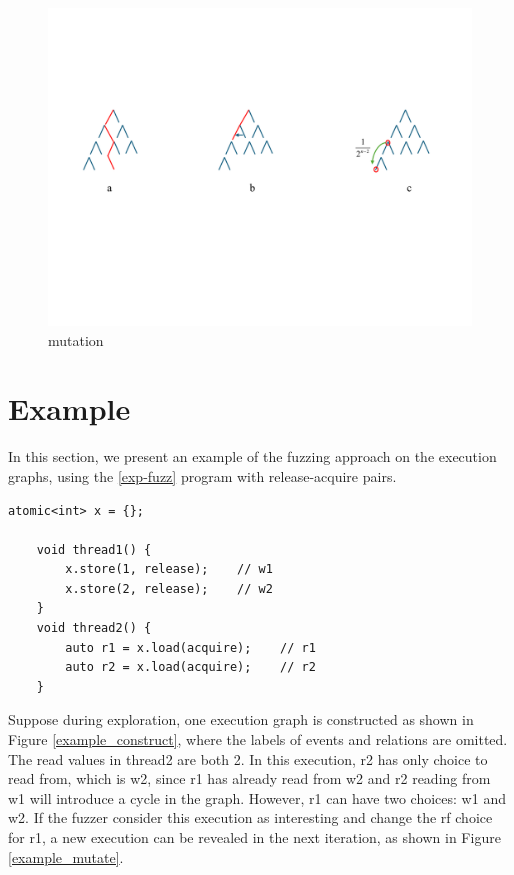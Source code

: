 \begin{figure}[htbp] %
    \centering
    \includegraphics[scale=0.5]{figure/tree3.pdf} %
    \caption{mutation} %
    \label{tree3} %
\end{figure}



\section{Example}

In this section, we present an example of the fuzzing approach on the execution graphs, using the \ref{exp-fuzz} program with release-acquire pairs. 

\begin{lstlisting}[caption={fuzzing example}, label={exp-fuzz}]
    atomic<int> x = {};
    
    void thread1() {
        x.store(1, release);    // w1
        x.store(2, release);    // w2
    }
    void thread2() {
        auto r1 = x.load(acquire);    // r1
        auto r2 = x.load(acquire);    // r2
    }
    \end{lstlisting}



Suppose during exploration, one execution graph is constructed as shown in Figure \ref{example_construct}, where the labels of events and relations are omitted. The read values in thread2 are both 2. In this execution, r2 has only choice to read from, which is w2, since r1 has already read from w2 and r2 reading from w1 will introduce a cycle in the graph. However, r1 can have two choices: w1 and w2. If the fuzzer consider this execution as interesting and change the rf choice for r1, a new execution can be revealed in the next iteration, as shown in Figure \ref{example_mutate}. 

